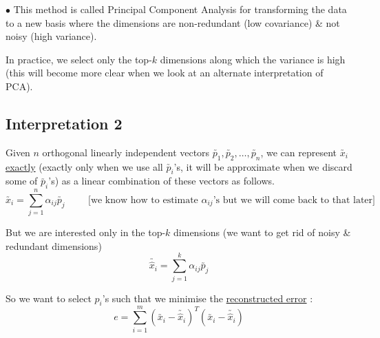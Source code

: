 \documentclass[11pt, a4paper]{article}
\begin{document}
\vspace{0.3cm}

$\bullet$ This method is called Principal Component Analysis for transforming the data to a new basis where the dimensions are non-redundant (low covariance) \& not noisy (high variance). \\

\vspace{0.3cm}

In practice, we select only the top-$k$ dimensions along which the variance is high (this will become more clear when we look at an alternate interpretation of PCA).

\newpage

\subsection{Interpretation 2}

Given $n$ orthogonal linearly independent vectors $\utilde{p_1}, \utilde{p_2}, \ldots, \utilde{p_n}$, we can represent $\utilde{x_i}$ \underline{exactly} (exactly only when we use all $\utilde{p_i}$'s, it will be approximate when we discard some of $\utilde{p_i}$'s) as a linear combination of these vectors as follows.
\[
\utilde{x_i} = \sum_{j=1}^{n} \alpha_{ij} \utilde{p_j} \hspace{1cm}  \text{[we know how to estimate $\alpha_{ij}$'s but we will come back to that later]}
\]

But we are interested only in the top-$k$ dimensions (we want to get rid of noisy \& redundant dimensions)
\[
\utilde{\hat{x}_i} = \sum_{j=1}^{k} \alpha_{ij} \utilde{p_j}
\]

So we want to select $p_i$'s such that we minimise the \underline{reconstructed error} :
\[
e = \sum_{i=1}^{m} (\utilde{x_i} - \utilde{\hat{x}_i})^T (\utilde{x_i} - \utilde{\hat{x}_i})
\]
\end{document}
